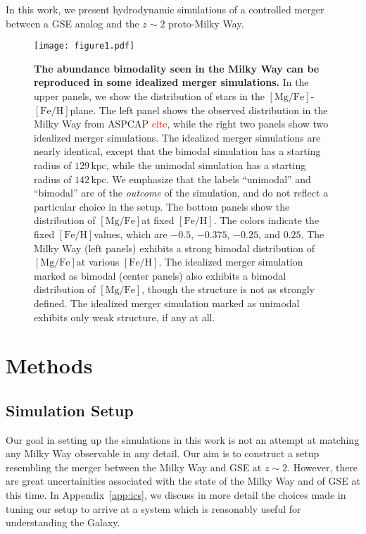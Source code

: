 \documentclass[linenumbers, twocolumn]{aastex631}
\newcommand{\kpc}{\ensuremath{\textrm{kpc}}}
\newcommand{\FeH}{\ensuremath{[\textrm{Fe}/\textrm{H}]}}
\newcommand{\MgFe}{\ensuremath{[\textrm{Mg}/\textrm{Fe}]}}
\newcommand{\red}[1]{\textcolor{red}{#1}}
\begin{document}
In this work, we present hydrodynamic simulations of a controlled merger between
a GSE analog and the $z\sim2$ proto-Milky Way. 

\begin{figure*}
  \centering
  \texttt{[image: figure1.pdf]}
  \caption{\textbf{The abundance bimodality seen in the Milky Way can be reproduced in some idealized merger simulations.} In the upper panels, we show the distribution of stars in the \MgFe-\FeH plane. The left panel shows the observed distribution in the Milky Way from ASPCAP \red{cite}, while the right two panels show two idealized merger simulations. The idealized merger simulations are nearly identical, except that the bimodal simulation has a starting radius of $129\,\kpc$, while the unimodal simulation has a starting radius of $142\,\kpc$. We emphasize that the labels ``unimodal'' and ``bimodal'' are of the \textit{outcome} of the simulation, and do not reflect a particular choice in the setup. The bottom panels show the distribution of \MgFe at fixed \FeH. The colors indicate the fixed \FeH values, which are $-0.5$, $-0.375$, $-0.25$, and $0.25$. The Milky Way (left panels) exhibits a strong bimodal distribution of \MgFe at various \FeH. The idealized merger simulation marked as bimodal (center panels) also exhibits a bimodal distribution of \MgFe, though the structure is not as strongly defined. The idealized merger simulation marked as unimodal exhibits only weak structure, if any at all.}
  \label{fig:fig1}
\end{figure*}

\section{Methods}\label{sec:methods}
\subsection{Simulation Setup}\label{ssec:setup}
Our goal in setting up the simulations in this work is not an attempt at matching any Milky Way observable in any detail. Our aim is to construct a setup resembling the merger between the Milky Way and GSE at $z\sim2$. However, there are great uncertainities associated with the state of the Milky Way and of GSE at this time. In Appendix~\ref{app:ics}, we discuss in more detail the choices made in tuning our setup to arrive at a system which is reasonably useful for understanding the Galaxy.
\end{document}
